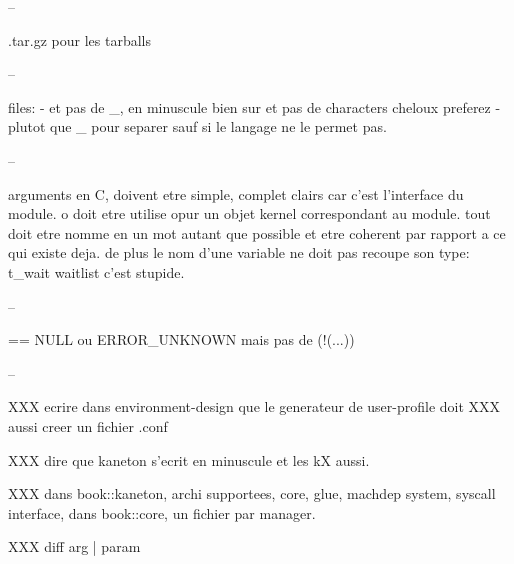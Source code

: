 --

.tar.gz pour les tarballs

--

files: - et pas de _, en minuscule bien sur et pas de characters cheloux
preferez - plutot que _ pour separer sauf si le langage ne le permet pas.

--

arguments en C, doivent etre simple, complet clairs car c'est l'interface
du module. o doit etre utilise opur un objet kernel correspondant au module.
tout doit etre nomme en un mot autant que possible et etre coherent par
rapport a ce qui existe deja. de plus le nom d'une variable ne doit
pas recoupe son type: t_wait waitlist c'est stupide.

--

== NULL ou ERROR_UNKNOWN mais pas de (!(...))

--

XXX ecrire dans environment-design que le generateur de user-profile doit
XXX aussi creer un fichier .conf

XXX dire que kaneton s'ecrit en minuscule et les kX aussi.

XXX dans book::kaneton, archi supportees, core, glue, machdep system, syscall
    interface, dans book::core, un fichier par manager.

XXX diff arg | param
